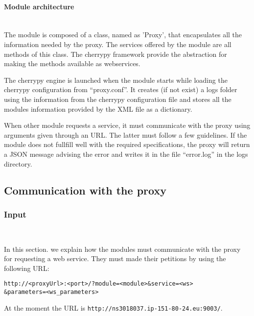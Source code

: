 \paragraph{Module architecture} \hspace{0pt} \\

The module is composed of a class, named as 'Proxy', that encapsulates all the information needed by the proxy. The services offered by the module are all methods of this class. The cherrypy framework provide the abstraction for making the methods available as webservices. 

The cherrypy engine is launched when the module starts while loading the cherrypy configuration from ``proxy.conf''. It creates (if not exist) a logs folder using the information from the cherrypy configuration file and stores all the modules information provided by the XML file as a dictionary. 

When other module requests a service, it must communicate with the proxy using arguments given through an URL. The latter must follow a few guidelines. If the module does not fullfill well with the required specifications, the proxy will return a JSON message advising the error and writes it in the file ``error.log'' in the logs directory.

\subsection{Communication with the proxy}

\subsubsection{Input}  \hspace{0pt} \\
\label{sec:input_proxy}

In this section. we explain how the modules must communicate with the proxy for requesting a web service. They must made their petitions by using the following URL:
\begin{verbatim}
http://<proxyUrl>:<port>/?module=<module>&service=<ws>
&parameters=<ws_parameters>
\end{verbatim}

At the moment the URL is \texttt{http://ns3018037.ip-151-80-24.eu:9003/}.
 
